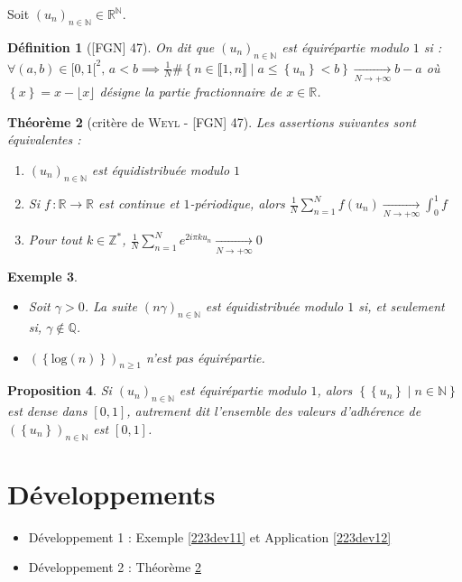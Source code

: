 \documentclass[10pt, a4paper, parskip=full, twoside, twocolumn]{report}
\newtheorem{definition}{Définition}
\newtheorem{theorem}[definition]{Théorème}
\newtheorem{proposition}[definition]{Proposition}
\newtheorem{example}[definition]{Exemple}
\newcommand{\IN}{\mathbb{N}}
\newcommand{\IZ}{\mathbb{Z}}
\newcommand{\IQ}{\mathbb{Q}}
\newcommand{\IR}{\mathbb{R}}
\begin{document}
\textcolor{paragraphtext}{Soit $\left(u_n\right)_{n\in\IN}\in\IR^{\IN}$.}
\begin{definition}[\textnormal{[FGN] 47}]
	On dit que $\left(u_n\right)_{n\in\IN}$ est \emph{équirépartie modulo $1$} si :
	$\forall (a,b)\in[0,1[^2,\, a<b\implies \frac{1}{N}\#\left\{n\in \llbracket 1,n \rrbracket \mid a\leq \left\{u_n\right\} < b\right\}\xrightarrow[N\to +\infty]{} b-a$
	où $\left\{x\right\} = x - \lfloor x \rfloor$ désigne la partie fractionnaire de $x\in\IR$.
\end{definition}

\begin{theorem}[critère de \textsc{Weyl} - \textnormal{[FGN] 47}]
	\label{223dev2}
	Les assertions suivantes sont équivalentes :
	\begin{enumerate}
		\item $\left(u_n\right)_{n\in\IN}$ est équidistribuée modulo $1$
		\item Si $f\,\colon \IR\to \IR$ est continue et $1$-périodique, alors $\frac{1}{N}\sum_{n=1}^{N}f(u_n)\xrightarrow[N\to +\infty]{} \int_{0}^{1} f$
		\item Pour tout $k\in\IZ^*$, $\frac{1}{N}\sum_{n=1}^{N} e^{2i\pi ku_n}\xrightarrow[N\to +\infty]{} 0$
	\end{enumerate}
\end{theorem}

\begin{example}
	\begin{itemize}
		\item Soit $\gamma > 0$. La suite $\left(n\gamma\right)_{n\in\IN}$ est équidistribuée modulo $1$ si, et seulement si, $\gamma\notin \IQ$.
		\item $\left(\left\{\text{log}(n)\right\}\right)_{n\geq 1}$ n'est pas équirépartie.
	\end{itemize}
\end{example}

\begin{proposition}
	Si $\left(u_n\right)_{n\in\IN}$ est équirépartie modulo $1$, alors $\left\{\left\{u_n\right\} \mid n\in \IN\right\}$ est dense dans $[0,1]$, autrement dit l'ensemble des valeurs d'adhérence de $\left(\left\{u_n\right\}\right)_{n\in\IN}$ est $[0,1]$.
\end{proposition}

\section*{Développements}
\begin{itemize}
	\item Développement 1 : Exemple \ref{223dev11} et Application \ref{223dev12}
	\item Développement 2 : Théorème \ref{223dev2}
\end{itemize}
\end{document}
